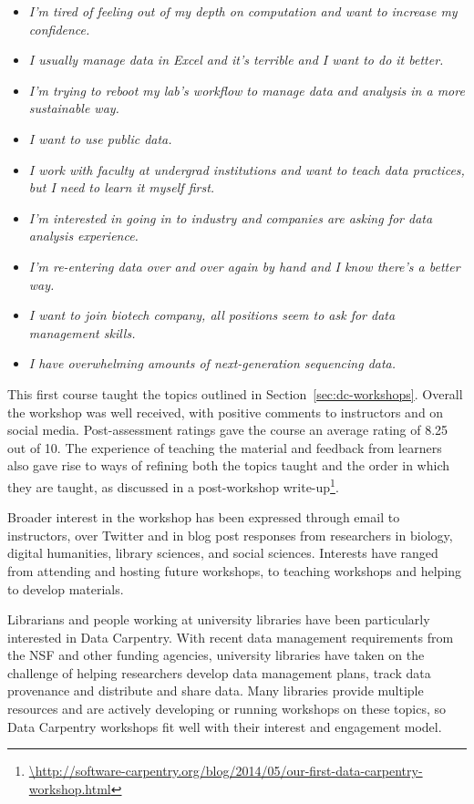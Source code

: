 \documentclass[11pt]{article}
\begin{document}
\begin{itemize}
\item \emph{I'm tired of feeling out of my depth on computation and want to increase my confidence.}
\item \emph{I usually manage data in Excel and it's terrible and I want to do it better.}
\item \emph{I'm trying to reboot my lab's workflow to manage data and analysis in a more sustainable way.}
\item \emph{I want to use public data.}
\item \emph{I work with faculty at undergrad institutions and want to teach data practices, but I need to learn it myself first.}
\item \emph{I'm interested in going in to industry and companies are asking for data analysis experience.}
\item \emph{I'm re-entering data over and over again by hand and I know there's a better way.}
\item \emph{I want to join biotech company, all positions seem to ask for data management skills.}
\item \emph{I have overwhelming amounts of next-generation sequencing data.}
\end{itemize}

This first course taught the topics outlined in
Section~\ref{sec:dc-workshops}. Overall the workshop was well received, with
positive comments to instructors and on social media. Post-assessment ratings
gave the course an average rating of 8.25 out of 10. The experience of teaching
the material and feedback from learners also gave rise to ways of refining both
the topics taught and the order in which they are taught, as discussed in a
post-workshop write-up\footnote{\url{\http://software-carpentry.org/blog/2014/05/our-first-data-carpentry-workshop.html}}.

Broader interest in the workshop has been expressed through email to instructors, over Twitter and in blog post responses from researchers in biology, digital humanities, library sciences, and social sciences.
Interests have
ranged from attending and hosting future workshops, to teaching workshops and helping to develop materials.

Librarians and people working at university libraries have been particularly
interested in Data Carpentry. With recent data management requirements from the NSF and other funding agencies, university libraries have
taken on the challenge of helping researchers develop data management plans, track data provenance and 
distribute and share data. Many libraries provide multiple resources and are actively developing or running workshops
on these topics, so Data Carpentry workshops fit well with their interest and engagement model.
\end{document}

